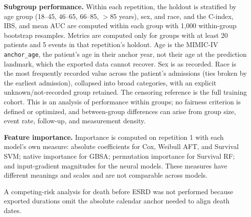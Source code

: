 \textbf{Subgroup performance.} Within each repetition, the holdout is stratified by age group (18--45, 46--65, 66--85, $>$85 years), sex, and race, and the C-index, IBS, and mean AUC are computed within each group with 1{,}000 within-group bootstrap resamples. Metrics are computed only for groups with at least 20 patients and 5 events in that repetition's holdout. Age is the MIMIC-IV \texttt{anchor\_age}, the patient's age in their anchor year, not their age at the prediction landmark, which the exported data cannot recover. Sex is as recorded. Race is the most frequently recorded value across the patient's admissions (ties broken by the earliest admission), collapsed into broad categories, with an explicit unknown/not-recorded group retained. The censoring reference is the full training cohort. This is an analysis of performance within groups; no fairness criterion is defined or optimized, and between-group differences can arise from group size, event rate, follow-up, and measurement density.

\textbf{Feature importance.} Importance is computed on repetition 1 with each model's own measure: absolute coefficients for Cox, Weibull AFT, and Survival SVM; native importance for GBSA; permutation importance for Survival RF; and input-gradient magnitudes for the neural models. These measures have different meanings and scales and are not comparable across models.

A competing-risk analysis for death before ESRD was not performed because exported durations omit the absolute calendar anchor needed to align death dates.
